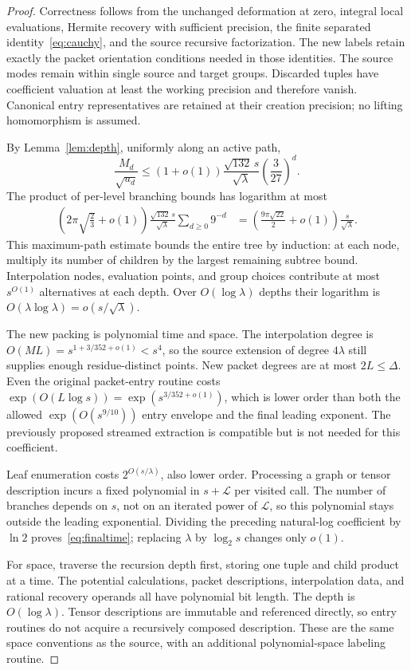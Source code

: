 \documentclass[11pt,letterpaper]{article}
\numberwithin{equation}{section}
\theoremstyle{definition}\newtheorem{definition}[theorem]{Definition}
\theoremstyle{remark}\newtheorem{remark}[theorem]{Remark}
\newcommand{\LL}{\mathcal L}
\begin{document}
\begin{proof}
Correctness follows from the unchanged deformation at zero, integral local evaluations, Hermite recovery with sufficient precision, the finite separated identity~\eqref{eq:cauchy}, and the source recursive factorization. The new labels retain exactly the packet orientation conditions needed in those identities. The source modes remain within single source and target groups. Discarded tuples have coefficient valuation at least the working precision and therefore vanish. Canonical entry representatives are retained at their creation precision; no lifting homomorphism is assumed.

By Lemma~\ref{lem:depth}, uniformly along an active path,
\[
 \frac{M_d}{\sqrt{u_d}}
 \le(1+o(1))\frac{\sqrt{132}\,s}{\sqrt\lambda}
       \left(\frac{3}{27}\right)^d.
\]
The product of per-level branching bounds has logarithm at most
\begin{align*}
 \left(2\pi\sqrt{\frac23}+o(1)\right)
 \frac{\sqrt{132}\,s}{\sqrt\lambda}
       \sum_{d\ge0}9^{-d}
 &=\left(\frac{9\pi\sqrt{22}}2+o(1)\right)
      \frac{s}{\sqrt\lambda}.
\end{align*}
This maximum-path estimate bounds the entire tree by induction: at each node, multiply its number of children by the largest remaining subtree bound. Interpolation nodes, evaluation points, and group choices contribute at most $s^{O(1)}$ alternatives at each depth. Over $O(\log\lambda)$ depths their logarithm is $O(\lambda\log\lambda)=o(s/\sqrt\lambda)$.

The new packing is polynomial time and space. The interpolation degree is $O(ML)=s^{1+3/352+o(1)}<s^4$, so the source extension of degree $4\lambda$ still supplies enough residue-distinct points. New packet degrees are at most $2L\le\Delta$. Even the original packet-entry routine costs $\exp(O(L\log s))=\exp(s^{3/352+o(1)})$, which is lower order than both the allowed $\exp(O(s^{9/10}))$ entry envelope and the final leading exponent. The previously proposed streamed extraction is compatible but is not needed for this coefficient.

Leaf enumeration costs $2^{O(s/\lambda)}$, also lower order. Processing a graph or tensor description incurs a fixed polynomial in $s+\LL$ per visited call. The number of branches depends on $s$, not on an iterated power of $\LL$, so this polynomial stays outside the leading exponential. Dividing the preceding natural-log coefficient by $\ln2$ proves~\eqref{eq:finaltime}; replacing $\lambda$ by $\log_2s$ changes only $o(1)$.

For space, traverse the recursion depth first, storing one tuple and child product at a time. The potential calculations, packet descriptions, interpolation data, and rational recovery operands all have polynomial bit length. The depth is $O(\log\lambda)$. Tensor descriptions are immutable and referenced directly, so entry routines do not acquire a recursively composed description. These are the same space conventions as the source, with an additional polynomial-space labeling routine.
\end{proof}
\end{document}
